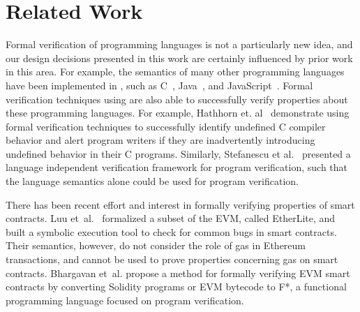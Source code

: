 \section{Related Work}
Formal verification of programming languages is not a particularly new idea,
and our design decisions presented in this work are certainly influenced by
prior work in this area. For example, the semantics of many other programming
languages have been implemented in \K{}, such as
C~\cite{ellison-2012-thesis}, Java~\cite{bogdanas-rosu-2015-popl},
and JavaScript~\cite{park-stefanescu-rosu-2015-pldi}. Formal verification
techniques using \K{} are also able to successfully verify properties about these
programming languages. For example, Hathhorn et.
al~\cite{hathhorn-ellison-rosu-2015-pldi} demonstrate using formal verification
techniques to successfully identify undefined C compiler behavior and alert
program writers if they are inadvertently introducing undefined behavior in
their C programs. Similarly, Stefanescu et al.~\cite{stefanescu-park-yuwen-li-rosu-2016-oopsla} presented a language independent verification framework for program verification, such that the language semantics alone could be used for program verification.

There has been recent effort and interest in formally verifying properties of
smart contracts. Luu et~al.~\cite{luumaking} formalized a subset of the EVM,
called EtherLite, and built a symbolic execution tool to check for common bugs
in smart contracts. Their semantics, however, do not consider the role of gas in
Ethereum transactions, and cannot be used to prove properties concerning gas on
smart contracts. Bhargavan et~al.\cite{evmf*} propose a method for formally
verifying EVM smart contracts by converting Solidity programs or EVM bytecode to
F*, a functional programming language focused on program verification.
